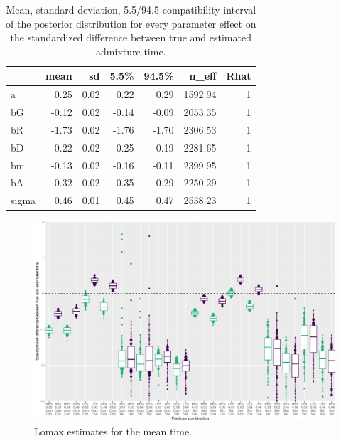 \documentclass[]{article}
\begin{document}
\begin{table}[h]
\caption{\label{tab:tableS1} Mean, standard deviation, 5.5/94.5 compatibility interval of the posterior distribution for every parameter effect on the standardized difference between true and estimated admixture time.}
\centering
\begin{tabular}{l|r|r|r|r|r|r}
\hline
  & mean & sd & 5.5\% & 94.5\% & n\_eff & Rhat\\
\hline
a & 0.25 & 0.02 & 0.22 & 0.29 & 1592.94 & 1\\
\hline
bG & -0.12 & 0.02 & -0.14 & -0.09 & 2053.35 & 1\\
\hline
bR & -1.73 & 0.02 & -1.76 & -1.70 & 2306.53 & 1\\
\hline
bD & -0.22 & 0.02 & -0.25 & -0.19 & 2281.65 & 1\\
\hline
bm & -0.13 & 0.02 & -0.16 & -0.11 & 2399.95 & 1\\
\hline
bA & -0.32 & 0.02 & -0.35 & -0.29 & 2250.29 & 1\\
\hline
sigma & 0.46 & 0.01 & 0.45 & 0.47 & 2538.23 & 1\\
\hline
\end{tabular}
\end{table}

\begin{figure}
\centering
\includegraphics{Admixture_Time_Inference_Paper_Draft_files/figure-latex/figS2-1.pdf}
\caption{\label{fig:figS2} Lomax estimates for the mean time.}
\end{figure}


\end{document}
